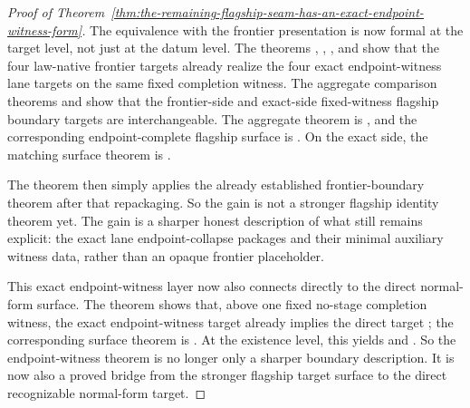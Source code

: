 \begin{proof}[Proof of Theorem~\ref{thm:the-remaining-flagship-seam-has-an-exact-endpoint-witness-form}]
The equivalence with the frontier presentation is now formal at the target
level, not just at the datum level. The theorems
,
,
,
and
show that the four law-native frontier targets already realize the four exact
endpoint-witness lane targets on the same fixed completion witness. The
aggregate comparison theorems
and
show that the frontier-side and exact-side fixed-witness flagship boundary
targets are interchangeable. The aggregate theorem is
,
and the corresponding endpoint-complete flagship surface is
.
On the exact side, the matching surface theorem is
.

The theorem then simply applies the already established frontier-boundary
theorem after that repackaging. So the gain is not a stronger flagship
identity theorem yet. The gain is a sharper honest description of what still
remains explicit: the exact lane endpoint-collapse packages and their minimal
auxiliary witness data, rather than an opaque frontier placeholder.

This exact endpoint-witness layer now also connects directly to the direct
normal-form surface. The theorem
shows that, above one fixed no-stage completion witness, the exact
endpoint-witness target already implies the direct target
; the corresponding surface theorem is
.
At the existence level, this yields
and
.
So the endpoint-witness theorem is no longer only a sharper boundary
description. It is now also a proved bridge from the stronger flagship target
surface to the direct recognizable normal-form target.


\end{proof}
